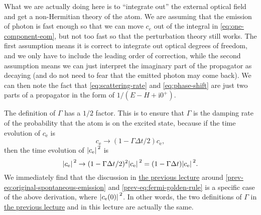 \documentclass[hyperref, a4paper]{article}
\newcommand*{\ii}{\mathrm{i}}
\newcommand{\prevlecture}{\href{11-18.pdf}{the previous lecture}}
\begin{document}
\begin{note*}{}
    What we are actually doing here is to ``integrate out'' the external optical field and get a non-Hermitian
    theory of the atom. We are assuming that the emission of photon is fast enough so that 
    we can move $c_e$ out of the integral in \eqref{eq:one-component-eom}, but not too fast so that the 
    perturbation theory still works. The first assumption means it is correct to integrate out optical degrees 
    of freedom, and we only have to include the leading order of correction, while the second assumption means 
    we can just interpret the imaginary part of the propagator as decaying (and do not need to fear that the 
    emitted photon may come back). We can then note the fact that \eqref{eq:scattering-rate} and 
    \eqref{eq:phase-shift} are just two parts of a propagator in the form of $1 / (E - H + \ii 0^+)$.

    The definition of $\Gamma$ has a $1/2$ factor. This is to ensure that $\Gamma$ is the damping rate of 
    the probability that the atom is on the excited state, because if the time evolution of $c_\text{e}$ is 
    \[
        c_\text{e} \to (1 - \Gamma \Delta t / 2) c_\text{e},
    \]
    then the time evolution of $\abs*{c_\text{e}}^2$ is 
    \[
        \abs*{c_\text{e}}^2 \to (1 - \Gamma \Delta t / 2)^2 \abs*{c_\text{e}}^2 = (1 - \Gamma \Delta t) \abs*{c_\text{e}}^2.
    \]
    We immediately find that the discussion in \prevlecture{} around \eqref{prev-eq:original-spontaneous-emission}
    and \eqref{prev-eq:fermi-golden-rule} is a specific case of the above derivation, where 
    $\abs*{c_\text{e}(0)}^2$. In other words, the two definitions of $\Gamma$ in \prevlecture{} and in this 
    lecture are actually the same. 
\end{note*}
\end{document}
